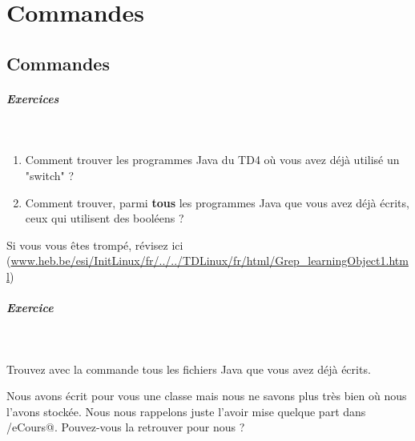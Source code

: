 \documentclass[11pt,a4paper]{article}
\begin{document}
        \section{Commandes}\subsection{Commandes}
			
		\subparagraph{Exercices} 
		
					\textcolor{white}{.} \par
				
					\begin{enumerate}
				
			\item 
							Comment trouver les programmes Java
							du TD4
							o\`u vous avez d\'ej\`a utilis\'e un "switch" ?
						
			\item 
							Comment trouver,
							parmi \textbf{tous}
							les programmes Java
							que vous avez d\'ej\`a \'ecrits,
							ceux qui utilisent des bool\'eens ?
						
					\end{enumerate}
				
			\par\medskip
            \par
         Si vous vous \^etes tromp\'e, r\'evisez ici (\url{www.heb.be/esi/InitLinux/fr/../../TDLinux/fr/html/Grep\_learningObject1.html})
            \par
        
			
		\subparagraph{Exercice} 
		
					\textcolor{white}{.} \par
				
            \par
        
          Trouvez avec la commande 
          \verb@find@
          tous les fichiers Java que vous avez d\'ej\`a \'ecrits.
        
            \par
        
			\par\medskip
          Nous avons \'ecrit pour vous une classe
          \verb@Color@
          mais nous ne savons plus tr\`es bien
          o\`u nous l'avons stock\'ee.
          Nous nous rappelons juste l'avoir mise
          quelque part dans 
          \verb@/eCours@.
          Pouvez-vous la retrouver pour nous ?
        
\end{document}
